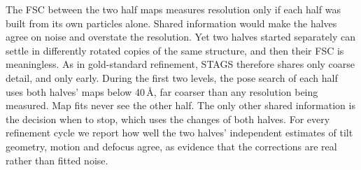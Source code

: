The FSC between the two half maps measures resolution only if each half was built from its own particles alone.
Shared information would make the halves agree on noise and overstate the resolution.
Yet two halves started separately can settle in differently rotated copies of the same structure, and then their FSC is meaningless.
As in gold-standard refinement, STAGS therefore shares only coarse detail, and only early.
During the first two levels, the pose search of each half uses both halves' maps below 40\,\AA, far coarser than any resolution being measured.
Map fits never see the other half.
The only other shared information is the decision when to stop, which uses the changes of both halves.
For every refinement cycle we report how well the two halves' independent estimates of tilt geometry, motion and defocus agree, as evidence that the corrections are real rather than fitted noise.

